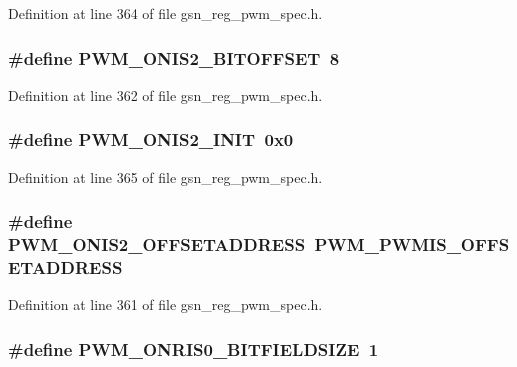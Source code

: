 Definition at line 364 of file gsn\_\-reg\_\-pwm\_\-spec.h.

\hypertarget{a00565_a09ba755539781bfcafe8199bf842bbe3}{
\subsubsection[{PWM\_\-ONIS2\_\-BITOFFSET}]{\setlength{\rightskip}{0pt plus 5cm}\#define PWM\_\-ONIS2\_\-BITOFFSET~8}}
\label{a00565_a09ba755539781bfcafe8199bf842bbe3}


Definition at line 362 of file gsn\_\-reg\_\-pwm\_\-spec.h.

\hypertarget{a00565_aba7cb03e39fb0141b6a79a0f298a8e6d}{
\subsubsection[{PWM\_\-ONIS2\_\-INIT}]{\setlength{\rightskip}{0pt plus 5cm}\#define PWM\_\-ONIS2\_\-INIT~0x0}}
\label{a00565_aba7cb03e39fb0141b6a79a0f298a8e6d}


Definition at line 365 of file gsn\_\-reg\_\-pwm\_\-spec.h.

\hypertarget{a00565_ad85b1ea970d53706a654bf2e50752b67}{
\subsubsection[{PWM\_\-ONIS2\_\-OFFSETADDRESS}]{\setlength{\rightskip}{0pt plus 5cm}\#define PWM\_\-ONIS2\_\-OFFSETADDRESS~PWM\_\-PWMIS\_\-OFFSETADDRESS}}
\label{a00565_ad85b1ea970d53706a654bf2e50752b67}


Definition at line 361 of file gsn\_\-reg\_\-pwm\_\-spec.h.

\hypertarget{a00565_a8c664a35e7e0c30111a95b5fe1ad1311}{
\subsubsection[{PWM\_\-ONRIS0\_\-BITFIELDSIZE}]{\setlength{\rightskip}{0pt plus 5cm}\#define PWM\_\-ONRIS0\_\-BITFIELDSIZE~1}}
\label{a00565_a8c664a35e7e0c30111a95b5fe1ad1311}


